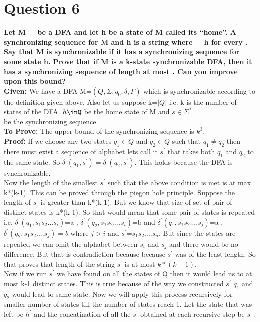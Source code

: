 \documentclass{article}
\begin{document}
\section{Question 6}
\textbf{Let M =  be a DFA and let h be a state of M called its “home”. A synchronizing
sequence for M and h is a string  where  = h for every . Say that M
is synchronizable if it has a synchronizing sequence for some state h. Prove that if M is a
k-state synchronizable DFA, then it has a synchronizing sequence of length at most  . Can you improve upon this bound?} \\
\newline
\textbf{Given:} We have a DFA M=$(Q, \Sigma, q_0 , \delta, F )$ which is synchronizable according to the definition given above. Also let us suppose k=$|Q|$ i.e. k is the number of states of the DFA. $h\inQ$ be the home state of M and $s\in\Sigma^{*}$\\ be the synchronizing sequence.\\ 
\textbf{To Prove:} The upper bound of the synchronizing sequence is $k^3$.\\
\textbf{Proof:} If we choose any two states $q_1\in Q$ and $q_2\in Q$ such that $q_1 \neq q_2$ then there must exist a sequence of alphabet lets call it $s^{'}$ that takes both $q_1$ and $q_2$ to the same state. So $\delta^{'}(q_1,s^{'})=\delta^{'}(q_2,s^{'})$. This holds because the DFA is synchronizable.\\
Now the length of the smallest $s^{'}$ such that the above condition is met is at max k*(k-1). This can be proved through the piegon hole principle. Suppose the length of $s^{'}$ is greater than k*(k-1). But we know that size of set of pair of distinct states is k*(k-1). So that would mean that some pair of states is repeated i.e. $\delta^{'}(q_1,s_1s_2...s_i)$=a , $\delta^{'}(q_2,s_1s_2....s_i)$=b and $\delta^{'}(q_1,s_1s_2....s_j)$=a , $\delta^{'}(q_2,s_1s_2....s_j)=b$ where $j>i$ and $s^{'}$=$s_1s_2....s_n$. But since the states are repeated we can omit the alphabet between $s_i$ and $s_j$ and there would be no difference. But that is contradiction because because $s^{'}$ was of the least length. So that proves that length of the string $s^{'}$ is at most $k*(k-1)$. \\
Now if we run $s^{'}$ we have found on all the states of Q then it would lead us to at most k-1 distinct states. This is true because of the way we constructed $s^{'}$ $q_1$ and $q_2$ would lead to same state. Now we will apply this process recursively for smaller number of states till the number of states reach 1. Let the state that was left be $h^{'}$ and the concatination of all the $s^{'}$ obtained  at each recursive step be $s^{''}$. \\
\end{document}
